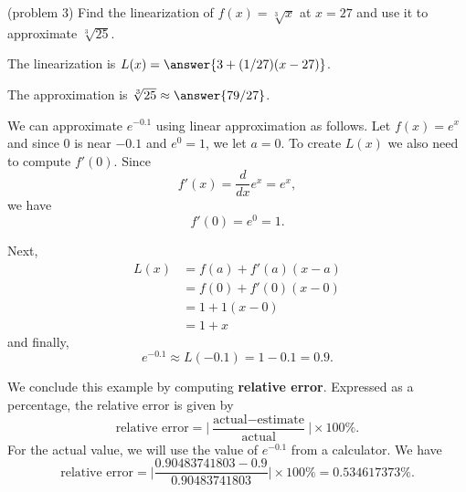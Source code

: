 \documentclass[handout]{ximera}
\begin{document}
\begin{problem}(problem 3)
Find the linearization of $f(x) = \sqrt[3] x$ at $x = 27$ and use it to approximate $\sqrt[3]{25}$.

The linearization is  $L(x) = \answer{3 + (1/27) (x-27)}$.

The approximation is $\sqrt[3]{25} \approx \answer{79/27}$.
\end{problem}

\begin{example}[example 4]
We can approximate $e^{-0.1}$ using linear approximation as follows. 
Let $f(x) = e^x$ and since 0 is near $-0.1$ and $e^0 = 1$, we let 
$a = 0$. To create $L(x)$ we also need to compute $f'(0)$. 
Since 
\[f'(x) = \frac{d}{dx} e^x = e^x,\] 
we have
\[f'(0) = e^0 = 1.\]

Next, 
\begin{align*}
L(x) &= f(a) + f'(a)(x - a) \\
&= f(0) + f'(0)(x - 0) \\
&= 1 + 1(x - 0)\\
& = 1 + x
\end{align*}
and finally,
\[
e^{-0.1} \approx L(-0.1) = 1 - 0.1 = 0.9.
\]

We conclude this example by computing \textbf{relative error}. Expressed as a percentage, the relative error is given by
\[
\text{relative error} = \Big|\frac{\text{actual} - \text{estimate}}{\text{actual}}\Big| \times 100 \%.
\]
For the actual value, we will use the value of $e^{-0.1}$ from a calculator.
We have
\[
\text{relative error} = \Big|\frac{0.90483741803 - 0.9}{0.90483741803}\Big| \times 100\% = 0.534617373\%.
\]

\end{example}


\begin{image}
\end{image}
\end{document}
